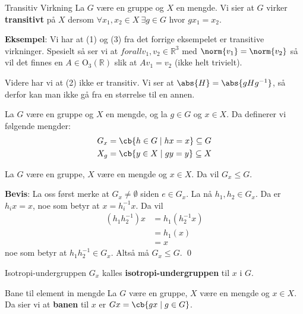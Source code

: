 \begin{definition}{Transitiv Virkning}{}
	La $G$ være en gruppe og $X$ en mengde. Vi sier at $G$ virker \textbf{transitivt} på
	$X$ dersom $\forall x_1, x_2\in X\ \exists g\in G$ hvor $gx_1 = x_2$.
\end{definition}

\textbf{Eksempel}: Vi har at (1) og (3) fra det forrige eksempelet er transitive virkninger.
Spesielt så ser vi at $forall v_1, v_2 \in \mathbb{R}^3$ med $\norm{v_1}=\norm{v_2}$ så vil det
finnes en $A \in \text{O}_3(\mathbb{R})$ slik at $Av_1 = v_2$ (ikke helt trivielt).

Videre har vi at (2) ikke er transitiv. Vi ser at $\abs{H} = \abs{gHg^{-1}}$, så derfor kan man
ikke gå fra en størrelse til en annen.

\begin{definition}{}{}
	La $G$ være en gruppe og $X$ en mengde, og la $g\in G$ og $x\in X$. Da definerer vi følgende
	mengder:
	\begin{align}
		G_x & = \cb{h\in G\mid hx = x} \subseteq G  \\
		X_g & = \cb{y \in X\mid gy = y} \subseteq X
	\end{align}
\end{definition}

\begin{theorem*}{}{}
	La $G$ være en gruppe, $X$ være en mengde og $x \in X$. Da vil $G_x \leq G$.
\end{theorem*}

\textbf{Bevis}:
La oss først merke at $G_x \neq \emptyset$ siden $e \in G_x$. La nå $h_1, h_2 \in G_x$. Da er
$h_i x = x$, noe som betyr at $x = h_i^{-1}x$. Da vil
\begin{align}
	(h_1h_2^{-1})x & = h_1(h_2^{-1}x) \\
	               & = h_1(x)         \\
	               & = x
\end{align}
noe som betyr at $h_1h_2^{-1} \in G_x$. Altså må $G_x \leq G$. \qed

\begin{definition}{Isotropi-undergruppen}{}
	$G_x$ kalles \textbf{isotropi-undergruppen} til $x$ i $G$.
\end{definition}

\begin{definition}{Bane til element in mengde}{}
	La $G$ være en gruppe, $X$ være en mengde og $x \in X$. Da sier vi at \textbf{banen} til $x$
	er $Gx = \cb{gx\mid g\in G}$.
\end{definition}

